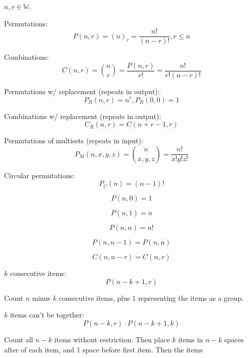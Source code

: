 \documentclass{article}
\begin{document}
    $n,r \in \mathbb{W}$.
    
    Permutations: \begin{equation}
        P(n, r) = (n)_r = \frac{n!}{(n - r)!}, r \leq n
    \end{equation}

    Combinations: \begin{equation}
        C(n, r) = {n \choose r} = \frac{P(n, r)}{r!} = \frac{n!}{r!(n - r)!}
    \end{equation}

    Permutations w/ replacement (repeats in output): \begin{equation}
        P_R(n, r) = n^r, P_R(0, 0) = 1
    \end{equation}

    Combinations w/ replacement (repeats in output): \begin{equation}
        C_R(n, r) = C(n + r - 1, r)
    \end{equation}

    Permutations of multisets (repeats in input): \begin{equation}
        P_M(n, x, y, z) = {n \choose x, y, z} = \frac{n!}{x!y!z!}
    \end{equation}

    Circular permutations: \begin{equation}
        P_C(n) = (n - 1)!
    \end{equation}

    $$P(n, 0) = 1$$

    $$P(n, 1) = n$$

    $$P(n, n) = n!$$
    
    $$P(n, n - 1) = P(n, n)$$
    
    $$C(n, n - r) = C(n, r)$$

    $k$ consecutive items: \begin{equation}
        P(n - k + 1, r)
    \end{equation}

    Count $n$ minus $k$ consecutive items, plus 1 representing the items as a group.

    $k$ items can't be together: \begin{equation}
        P(n - k, r) \cdot P(n - k + 1, k)
    \end{equation}

    Count all $n - k$ items without restriction. Then place $k$ items in $n - k$ spaces after of each item, and 1 space before first item. Then the items
\end{document}
